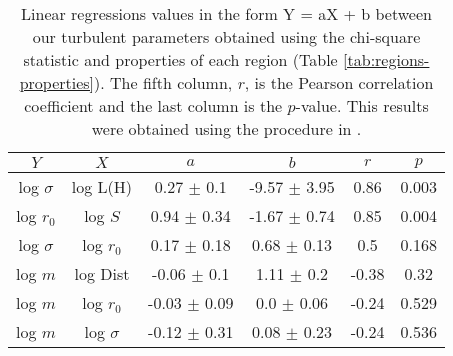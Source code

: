 \begin{table*}
\begin{center}
\caption{Linear regressions values in the form Y = aX + b between our turbulent parameters obtained using the chi-square statistic and properties of each region (Table \ref{tab:regions-properties}). The fifth column, $r$, is the Pearson correlation coefficient and the last column is the $p$-value. This results were obtained using the procedure in \citet{2007ApJ...665.1489K}.}
\begin{tabular}{cccccc}
\hline
            $Y$ &                   $X$ &                 $a$ &                 $b$ &       $r$ &      $p$ \\
\hline
 log $\sigma$ &            log L(H) &    0.27 $\pm$ 0.1 &  -9.57 $\pm$ 3.95 &   0.86 &  0.003 \\
    log $r_0$ &             log $S$ &   0.94 $\pm$ 0.34 &  -1.67 $\pm$ 0.74 &   0.85 &  0.004 \\
 log $\sigma$ &         log $r_{0}$ &   0.17 $\pm$ 0.18 &   0.68 $\pm$ 0.13 &    0.5 &  0.168 \\
      log $m$ &            log Dist &   -0.06 $\pm$ 0.1 &    1.11 $\pm$ 0.2 &  -0.38 &   0.32 \\
      log $m$ &         log $r_{0}$ &  -0.03 $\pm$ 0.09 &    0.0 $\pm$ 0.06 &  -0.24 &  0.529 \\
      log $m$ &        log $\sigma$ &  -0.12 $\pm$ 0.31 &   0.08 $\pm$ 0.23 &  -0.24 &  0.536 \\
\bottomrule
\end{tabular}\label{tab:RestStats}
\end{center}
\end{table*}


